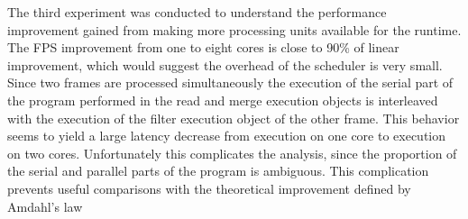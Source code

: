 The third experiment was conducted to understand the performance improvement gained from making more processing units available for the runtime. The FPS improvement from one to eight cores is close to 90\% of linear improvement, which would suggest the overhead of the scheduler is very small. Since two frames are processed simultaneously the execution of the serial part of the program performed in the read and merge execution objects is interleaved with the execution of the filter execution object of the other frame. This behavior seems to yield a large latency decrease from execution on one core to execution on two cores. Unfortunately this complicates the analysis, since the proportion of the serial and parallel parts of the program is ambiguous. This complication prevents useful comparisons with the theoretical improvement defined by Amdahl's law~\cite{amdahl1967validity}
